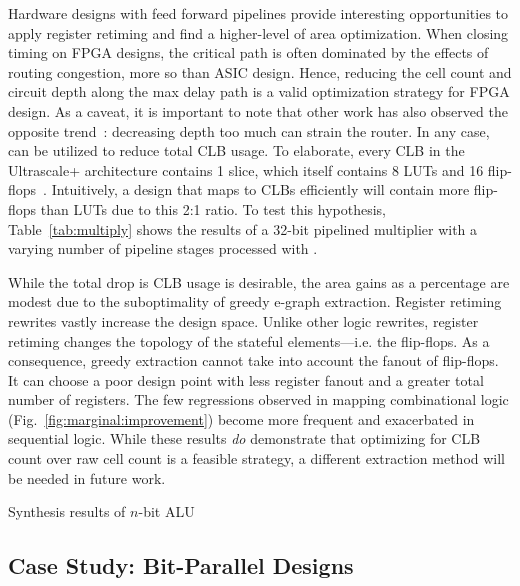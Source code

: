 Hardware designs with feed forward pipelines provide interesting opportunities
to apply register retiming and find a higher-level of area optimization. When
closing timing on FPGA designs, the critical path is often dominated by the
effects of routing congestion, more so than ASIC design. Hence, reducing the
cell count and circuit depth along the max delay path is a valid optimization
strategy for FPGA design. As a caveat, it is important to note that other work
has also observed the opposite trend~\cite{academicfpga}: decreasing depth too
much can strain the router. In any case, \shortname{} can be utilized to reduce total
CLB usage. To elaborate, every CLB in the Ultrascale+ architecture contains 1
slice, which itself contains 8 LUTs and 16 flip-flops~\cite{ug574}.
Intuitively, a design that maps to CLBs efficiently will contain more
flip-flops than LUTs due to this 2:1 ratio. To test this hypothesis,
Table~\ref{tab:multiply} shows the results of a 32-bit pipelined multiplier
with a varying number of pipeline stages processed with \shortname{}.

While the total drop is CLB usage is desirable, the area gains as a percentage
are modest due to the suboptimality of greedy e-graph extraction. Register
retiming rewrites vastly increase the design space. Unlike other logic
rewrites, register retiming changes the topology of the stateful
elements---i.e. the flip-flops. As a consequence, greedy extraction cannot take
into account the fanout of flip-flops. It can choose a poor design point with
less register fanout and a greater total number of registers. The few
regressions observed in mapping combinational logic
(Fig.~\ref{fig:marginal:improvement}) become more frequent and exacerbated in
sequential logic. While these results \textit{do} demonstrate that optimizing
for CLB count over raw cell count is a feasible strategy, a different
extraction method will be needed in future work.

\begin{table}
    \centering
    \caption{Synthesis results of $n$-bit ALU}\label{tab:alu}
\end{table}

\subsection{Case Study: Bit-Parallel Designs}\label{sec:results:scalability}

